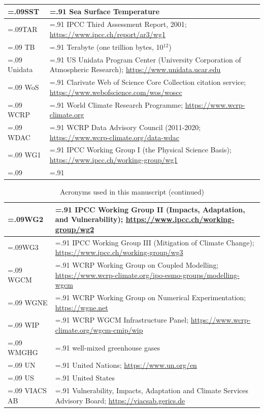 \documentclass[manuscript]{copernicus}
\begin{document}
\begin{table}[htp]
{\begin{tabularx}{1\textwidth} { 
	  | >{\raggedright\arraybackslash\hsize=.09\hsize}X
	  | >{\centering\arraybackslash\hsize=.91\hsize}X | }
SST & Sea Surface Temperature\\ \hline
TAR & IPCC Third Assessment Report, 2001; \url{https://www.ipcc.ch/report/ar3/wg1}\\ \hline
TB & Terabyte (one trillion bytes, 10$^{12}$)\\ \hline
Unidata & US Unidata Program Center (University Corporation of Atmospheric Research); \url{https://www.unidata.ucar.edu}\\ \hline 
WoS & Clarivate Web of Science Core Collection citation service; \url{https://www.webofscience.com/wos/woscc}\\ \hline
WCRP & World Climate Research Programme; \url{https://www.wcrp-climate.org}\\ \hline
WDAC & WCRP Data Advisory Council (2011-2020; \url{https://www.wcrp-climate.org/data-wdac}\\ \hline
WG1 & IPCC Working Group I (the Physical Science Basis); \url{https://www.ipcc.ch/working-group/wg1}\\ \hline
\multicolumn{2}{l}{\textbf{\autoref{tab:tabAppE1-Acronyms} continued overpage..}}\\
\end{tabularx}
} %
\end{table}

\addtocounter{table}{-1}
\begin{table}[htp]
\renewcommand{\arraystretch}{2}
\scriptsize
\centering
\caption{Acronyms used in this manuscript (continued)}
\resizebox{\textwidth}{!} {
	\begin{tabularx}{1\textwidth} { 
	  | >{\raggedright\arraybackslash\hsize=.09\hsize}X
	  | >{\centering\arraybackslash\hsize=.91\hsize}X | }
\hline
WG2 & IPCC Working Group II (Impacts, Adaptation, and Vulnerability); \url{https://www.ipcc.ch/working-group/wg2}\\ \hline
WG3 & IPCC Working Group III (Mitigation of Climate Change); \url{https://www.ipcc.ch/working-group/wg3}\\ \hline
WGCM & WCRP Working Group on Coupled Modelling; \url{https://www.wcrp-climate.org/ipo-esmo-groups/modelling-wgcm}\\ \hline
WGNE & WCRP Working Group on Numerical Experimentation; \url{https://wgne.net}\\ \hline
WIP & WCRP WGCM Infrastructure Panel; \url{https://www.wcrp-climate.org/wgcm-cmip/wip}\\ \hline
WMGHG & well-mixed greenhouse gases\\ \hline
UN & United Nations; \url{https://www.un.org/en}\\ \hline
US & United States\\ \hline
VIACS AB & Vulnerability, Impacts, Adaptation and Climate Services Advisory Board; \url{https://viacsab.gerics.de}\\ \hline
\end{tabularx}
} %
\label{tab:tabAppE1-Acronyms}
\footnotesize{}
\end{table}
\end{document}
